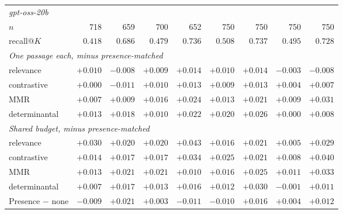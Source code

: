 \begin{tabular}{lrrrrrrrr}
\midrule\multicolumn{9}{l}{\emph{gpt-oss-20b}} \\
$n$ & 718 & 659 & 700 & 652 & 750 & 750 & 750 & 750 \\
recall@$K$ & $0.418$ & $0.686$ & $0.479$ & $0.736$ & $0.508$ & $0.737$ & $0.495$ & $0.728$ \\
\midrule\multicolumn{9}{l}{\emph{One passage each, minus presence-matched}} \\
relevance & $+0.010$ & $-0.008$ & $+0.009$ & $+0.014$ & $+0.010$ & $+0.014$ & $-0.003$ & $-0.008$ \\
contrastive & $+0.000$ & $-0.011$ & $+0.010$ & $+0.013$ & $+0.009$ & $+0.013$ & $+0.004$ & $+0.007$ \\
MMR & $+0.007$ & $+0.009$ & $\mathit{+0.016}$ & $\mathit{+0.024}$ & $+0.013$ & $\mathit{+0.021}$ & $+0.009$ & $\mathbf{+0.031}$ \\
determinantal & $+0.013$ & $+0.018$ & $+0.010$ & $\mathit{+0.022}$ & $\mathbf{+0.020}$ & $\mathit{+0.026}$ & $+0.000$ & $+0.008$ \\
\midrule\multicolumn{9}{l}{\emph{Shared budget, minus presence-matched}} \\
relevance & $\mathbf{+0.030}$ & $+0.020$ & $\mathit{+0.020}$ & $\mathbf{+0.043}$ & $+0.016$ & $+0.021$ & $+0.005$ & $\mathbf{+0.029}$ \\
contrastive & $+0.014$ & $+0.017$ & $\mathit{+0.017}$ & $\mathbf{+0.034}$ & $\mathbf{+0.025}$ & $+0.021$ & $+0.008$ & $\mathbf{+0.040}$ \\
MMR & $+0.013$ & $+0.021$ & $\mathit{+0.021}$ & $+0.010$ & $\mathit{+0.016}$ & $\mathit{+0.025}$ & $+0.011$ & $\mathbf{+0.033}$ \\
determinantal & $+0.007$ & $+0.017$ & $+0.013$ & $+0.016$ & $+0.012$ & $\mathbf{+0.030}$ & $-0.001$ & $+0.011$ \\
Presence $-$ none & $-0.009$ & $\mathit{+0.021}$ & $+0.003$ & $-0.011$ & $-0.010$ & $+0.016$ & $+0.004$ & $+0.012$ \\
\bottomrule
\end{tabular}
